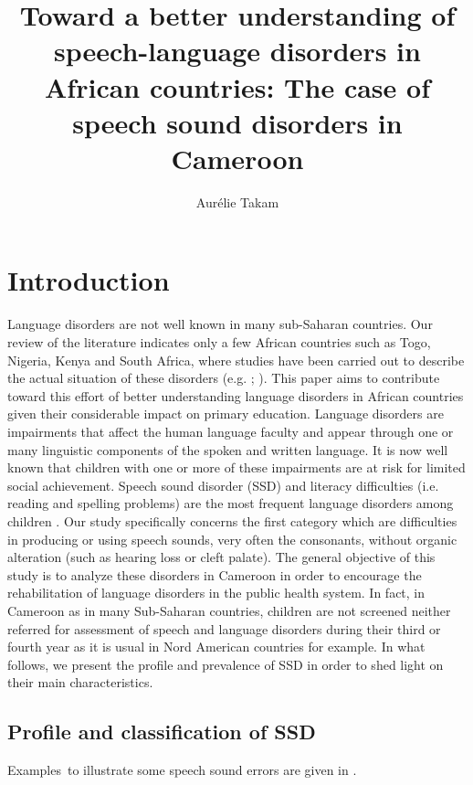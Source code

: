 \documentclass[output=paper,newtxmath,modfonts,nonflat,draftmode]{langsci/langscibook}
\author{Aurélie Takam\affiliation{Department of African Languages and Linguistics, University of Yaoundé 1\newline Department of French studies, York University}}
\title{Toward a better understanding of speech-language disorders in African countries: The case of speech sound disorders in Cameroon}
\begin{document}
 
\maketitle


\section{Introduction} %

Language disorders are not well known in many sub-Saharan countries. Our review of the literature indicates only a few African countries such as Togo, Nigeria, Kenya and South Africa, where studies have been carried out to describe the actual situation of these disorders (e.g. \citealt{Van2016}; \citealt{Topouzkhanian2013}). This paper aims to contribute toward this effort of better understanding language disorders in African countries given their considerable impact on primary education. Language disorders are impairments that affect the human language faculty and appear through one or many linguistic components of the spoken and written language. It is now well known that children with one or more of these impairments are at risk for limited social achievement. Speech sound disorder (SSD) and literacy difficulties (i.e. reading and spelling problems) are the most frequent language disorders among children \citep{Ruscello1991}. Our study specifically concerns the first category which are difficulties in producing or using speech sounds, very often the consonants, without organic alteration (such as hearing loss or cleft palate). The general objective of this study is to analyze these disorders in Cameroon in order to encourage the rehabilitation of language disorders in the public health system. In fact, in Cameroon as in many Sub-Saharan countries, children are not screened neither referred for assessment of speech and language disorders during their third or fourth year as it is usual in Nord American countries for example. In what follows, we present the profile and prevalence of SSD in order to shed light on their main characteristics. 

\subsection{Profile and classification of SSD} %

Examples~to illustrate some speech sound errors are given in .
\end{document}
